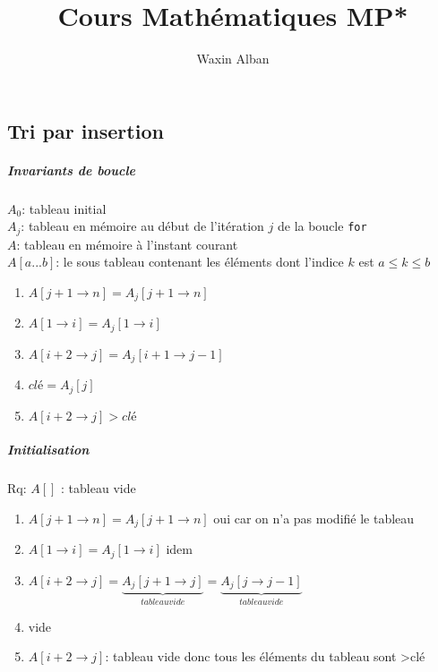 \documentclass[12pt]{report}
\title{Cours Mathématiques MP*}
\author{Waxin Alban}
\begin{document}
\chapter{}

\section{Tri par insertion}

\begin{center}
\end{center}

\paragraph*{Invariants de boucle}

$A_0$: tableau initial\\
$A_j$: tableau en mémoire au début de l'itération $j$ de la boucle \verb|for|\\
$A$: tableau en mémoire à l'instant courant\\
$A[a...b]$:  le sous tableau contenant les éléments dont l'indice $k$ est $a \leq k \leq b$

\begin{enumerate}
	\item $A[j+1 \to n] = A_j[j+1 \to n]$
	\item $A[1 \to i] = A_j[1 \to i]$
	\item $A[i+2 \to j] =A_j[i+1 \to j-1]$
	\item $clé = A_j[j]$
	\item $A[i+2 \to j] > clé$
\end{enumerate}

\paragraph*{Initialisation}
Rq: $A[]$ : tableau vide
\begin{enumerate}
	\item $A[j+1 \to n] = A_j[j+1 \to n]$ oui car on n'a pas modifié le tableau
	\item $A[1 \to i] = A_j[1 \to i]$ idem
	\item $A[i+2 \to j] = \underbrace{A_j[j+1 \to j]}_{tableau vide} = \underbrace{A_j[j \to j-1]}_{tableau vide}$ 
	\item vide
	\item $A[i+2 \to j]$: tableau vide donc tous les éléments du tableau sont >clé
\end{enumerate}
\end{document}
